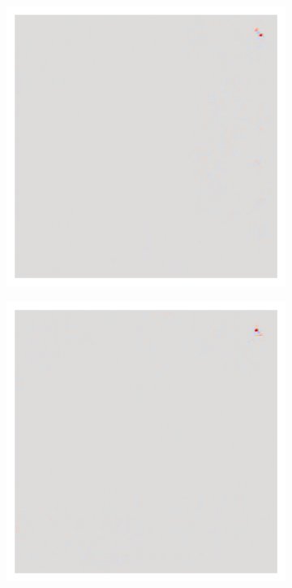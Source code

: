\begin{figure}[H]
\begin{subfigure}{0.19\linewidth}
    \end{subfigure}\hfill%
    \begin{subfigure}{0.19\linewidth}
        \centering
        \includegraphics[height=1\linewidth]{01-images/05-resultate/uap_resnet50/uap2-resnet50-covidx_data-n200-robustificationslevel0.png}
    \end{subfigure}\hfill%
    \begin{subfigure}{0.19\linewidth}
        \centering
        \includegraphics[height=1\linewidth]{01-images/05-resultate/uap_resnet50/uap3-resnet50-covidx_data-n200-robustificationslevel0.png}

\end{subfigure}
\end{figure}
